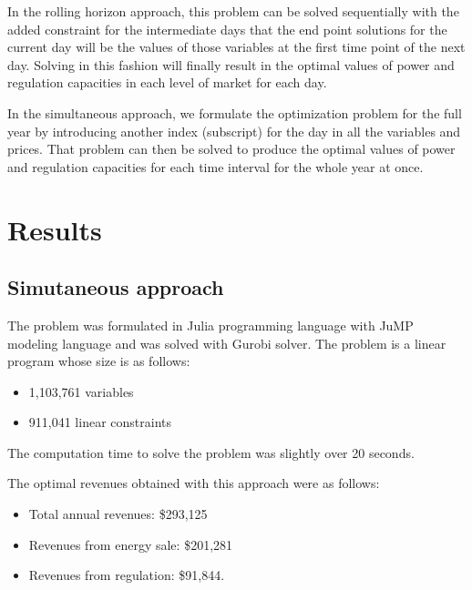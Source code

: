 \documentclass[11pt,twoside]{article}
\begin{document}
In the rolling horizon approach, this problem can be solved sequentially with the added constraint for the intermediate days that the end point solutions for the current day will be the values of those variables at the first time point of the next day. Solving in this fashion will finally result in the optimal values of power and regulation capacities in each level of market for each day.

In the simultaneous approach, we formulate the optimization problem for the full year by introducing another index (subscript) for the day in all the variables and prices. That problem can then be solved to produce the optimal values of power and regulation capacities for each time interval for the whole year at once.


\section{Results}
\subsection{Simutaneous approach}
The problem was formulated in Julia programming language with JuMP modeling language and was solved with Gurobi solver. The problem is a linear program whose size is as follows:
\begin{itemize}
\item 1,103,761 variables
\item 911,041 linear constraints
\end{itemize}
The computation time to solve the problem was slightly over 20 seconds.

The optimal revenues obtained with this approach were as follows:
\begin{itemize}
\item Total annual revenues: \$293,125
\item Revenues from energy sale: \$201,281
\item Revenues from regulation: \$91,844.
\end{itemize}
\end{document}
